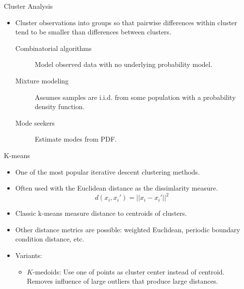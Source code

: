 \documentclass[aspectratio=169]{beamer}
\begin{document}
\begin{frame}{Cluster Analysis}
    \begin{itemize}
        \item Cluster observations into groups so that pairwise differences within cluster tend to be smaller than differences between clusters.
        \begin{description}
        \item[Combinatorial algorithms] Model observed data with no underlying probability model.
        \item[Mixture modeling] Assumes samples are i.i.d. from some population with a probability density function.
        \item[Mode seekers] Estimate modes from PDF.
        \end{description}
    \end{itemize}
\end{frame}

\begin{frame}{K-means}
    \begin{itemize}
        \item One of the most popular iterative descent clustering methods.
        \item Often used with the Euclidean distance as the dissimlarity measure.
        \begin{equation*}
            d(x_i, x_i') = ||x_i - x_i'||^2
        \end{equation*}
        \item Classic k-means measure distance to centroids of clusters.
        \item Other distance metrics are possible: weighted Euclidean, periodic boundary condition distance, etc.
        \item Variants:
        \begin{itemize}
            \item $K$-medoids: Use one of points as cluster center instead of centroid. Removes influence of large outliers that produce large distances.
        \end{itemize}
    \end{itemize}
\end{frame}
\end{document}
